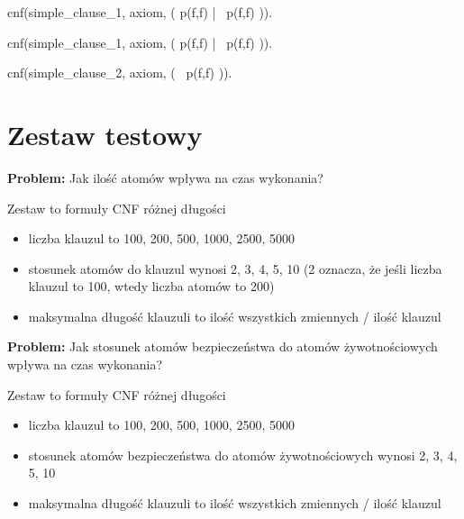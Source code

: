\documentclass[a4paper,12pt]{article}
\begin{document}
\begin{tptpcode}
cnf(simple_clause_1, axiom,
    ( p(f,f) | ~p(f,f) )).

\end{tptpcode}

\begin{tptpcode}
cnf(simple_clause_1, axiom,
    ( p(f,f) | ~p(f,f) )).

cnf(simple_clause_2, axiom,
    ( ~p(f,f) )).

\end{tptpcode}

\newpage
\section{Zestaw testowy}


\noindent
\textbf{Problem:} Jak ilość atomów wpływa na czas wykonania?

Zestaw to formuły CNF różnej długości
\begin{itemize}
  \item liczba klauzul to 100, 200, 500, 1000, 2500, 5000
  \item stosunek atomów do klauzul wynosi 2, 3, 4, 5, 10 (2 oznacza, że jeśli liczba klauzul to 100, wtedy liczba atomów to 200)
  \item maksymalna długość klauzuli to ilość wszystkich zmiennych / ilość klauzul
\end{itemize}

\noindent
\textbf{Problem:} Jak stosunek atomów bezpieczeństwa do atomów żywotnościowych wpływa na czas wykonania?

Zestaw to formuły CNF różnej długości
\begin{itemize}
  \item liczba klauzul to 100, 200, 500, 1000, 2500, 5000
  \item stosunek atomów bezpieczeństwa do atomów żywotnościowych wynosi 2, 3, 4, 5, 10
  \item maksymalna długość klauzuli to ilość wszystkich zmiennych / ilość klauzul
\end{itemize}
\end{document}
